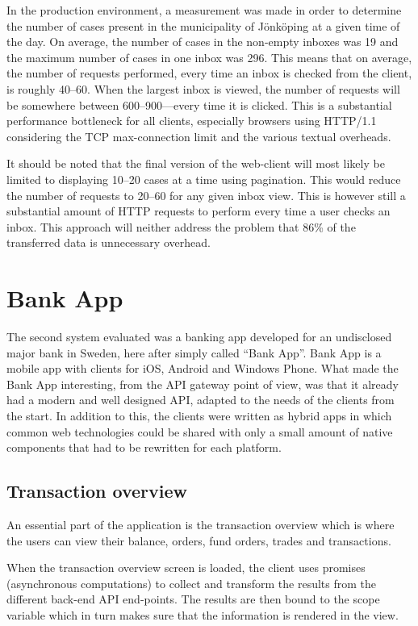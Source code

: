 \documentclass{cslthse-msc}
\begin{document}
In the production environment, a measurement was made in order to determine the number of cases present in the municipality of Jönköping at a given time of the day. On average, the number of cases in the non-empty inboxes was 19 and the maximum number of cases in one inbox was 296. This means that on average, the number of requests performed, every time an inbox is checked from the client, is roughly 40--60. When the largest inbox is viewed, the number of requests will be somewhere between 600--900---every time it is clicked. This is a substantial performance bottleneck for all clients, especially browsers using HTTP/1.1 considering the TCP max-connection limit and the various textual overheads.

It should be noted that the final version of the web-client will most likely be limited to displaying 10--20 cases at a time using pagination. This would reduce the number of requests to 20--60 for any given inbox view. This is however still a substantial amount of HTTP requests to perform every time a user checks an inbox. This approach will neither address the problem that 86\% of the transferred data is unnecessary overhead.

\section{Bank App}
The second system evaluated was a banking app developed for an undisclosed major bank in Sweden, here after simply called \enquote{Bank App}. Bank App is a mobile app with clients for iOS, Android and Windows Phone. What made the Bank App interesting, from the API gateway point of view, was that it already had a modern and well designed API, adapted to the needs of the clients from the start. In addition to this, the clients were written as hybrid apps in which common web technologies could be shared with only a small amount of native components that had to be rewritten for each platform.

\subsection{Transaction overview}
An essential part of the application is the transaction overview which is where the users can view their balance, orders, fund orders, trades and transactions.

When the transaction overview screen is loaded, the client uses promises (asynchronous computations) to collect and transform the results from the different back-end API end-points. The results are then bound to the scope variable which in turn makes sure that the information is rendered in the view.
\end{document}

